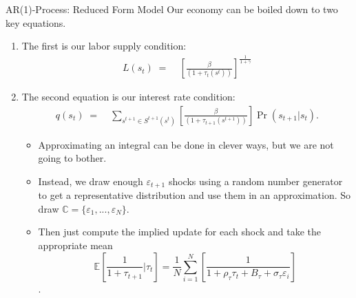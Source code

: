 \documentclass[10pt,c,aspectratio=1610,handout]{beamer}
\begin{document}
\begin{frame}{AR(1)-Process: Reduced Form Model}%
  Our economy can be boiled down to two key equations.%
  \pause%
  \begin{enumerate}%
    \item The first is our labor supply condition:%
    \begin{align}%
      L(s_{t}) \; = & \; \left[ \frac{\beta}{(1+\tau_{t}(s^{t}))} \right]^{\frac{1}{1+\gamma}} \label{D1}%
    \end{align}%
    \pause%
    \item The second equation is our interest rate condition:%
    \begin{align}%
      q(s_{t}) \; = & \; \sum_{s^{t+1}\in S^{t+1}(s^{t})}\left[ \frac{\beta }{(1+\tau_{t+1}(s^{t+1}))}\right] \Pr (s_{t+1}|s_{t}).%
    \end{align}%
    \begin{itemize}%
      \item[$\rightarrow$] Approximating an integral can be done in clever ways, but we are not going to bother.%
      \pause%
      \item[$\rightarrow$] Instead, we draw enough $\varepsilon_{t+1}$ shocks using a random number generator to get a representative distribution and use them in an approximation. So draw $\mathbb{C} = \{\varepsilon_1, ..., \varepsilon_N \}$.%
      \pause%
      \item[$\rightarrow$] Then just compute the implied update for each shock and take the appropriate mean \[ \mathbb{E} \left [ \frac{1}{1+\tau_{t+1}} \Big | \tau_t \right ] = \frac{1}{N} \sum_{i=1}^N \left[ \frac{1}{1+\rho _{\tau }\tau _{t}+B_{\tau }+\sigma _{\tau }\varepsilon_{i} } \right] \].%
    \end{itemize}%
  \end{enumerate}%
\end{frame}%
\end{document}
